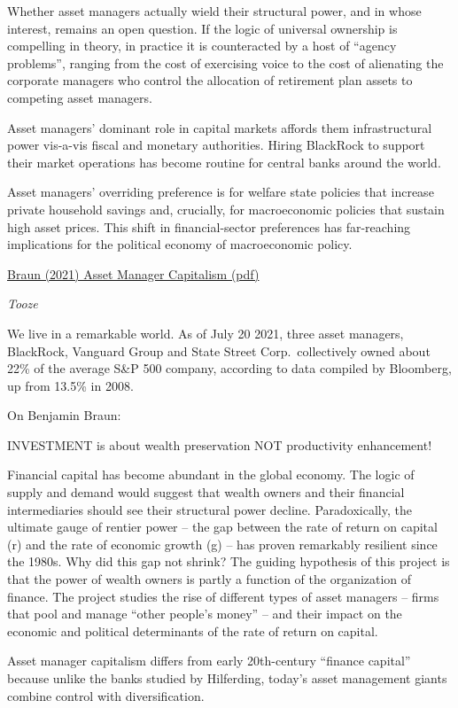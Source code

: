 \documentclass[
]{book}
\begin{document}
Whether asset managers actually wield their structural power, and in whose interest,
remains an open question.
If the logic of universal ownership
is compelling in theory, in practice it is counteracted by a host of ``agency problems'',
ranging from the cost of exercising voice to the cost of alienating the corporate managers
who control the allocation of retirement plan assets to competing asset managers.

Asset managers' dominant role in capital
markets affords them infrastructural power vis-a-vis fiscal and monetary authorities.
Hiring BlackRock to support their market operations has become routine
for central banks around the world.

Asset managers'
overriding preference is for welfare state policies that increase private household savings
and, crucially, for macroeconomic policies that sustain high asset prices.
This
shift in financial-sector preferences has far-reaching implications for the political economy
of macroeconomic policy.

\href{pdf/Braun_2021_Asset_Mamager_Capitalism.pdf}{Braun (2021) Asset Manager Capitalism (pdf)}

\emph{Tooze}

We live in a remarkable world. As of July 20 2021, three asset managers, BlackRock, Vanguard Group and State Street Corp.~collectively owned about 22\% of the average S\&P 500 company, according to data compiled by Bloomberg, up from 13.5\% in 2008.

On Benjamin Braun:

INVESTMENT is about wealth preservation NOT productivity enhancement!

Financial capital has become abundant in the global economy. The logic of supply and demand would suggest that wealth owners and their financial intermediaries should see their structural power decline. Paradoxically, the ultimate gauge of rentier power -- the gap between the rate of return on capital (r) and the rate of economic growth (g) -- has proven remarkably resilient since the 1980s. Why did this gap not shrink? The guiding hypothesis of this project is that the power of wealth owners is partly a function of the organization of finance. The project studies the rise of different types of asset managers -- firms that pool and manage ``other people's money'' -- and their impact on the economic and political determinants of the rate of return on capital.

Asset manager capitalism differs from early 20th-century ``finance capital'' because unlike the banks studied by Hilferding, today's asset management giants combine control with diversification.
\end{document}
